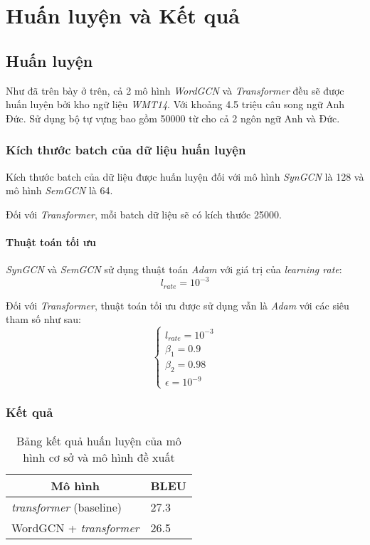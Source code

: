 \chapter{Huấn luyện và Kết quả}

\section{Huấn luyện}

Như đã trên bày ở trên, cả 2 mô hình \textit{WordGCN} và  \textit{Transformer}  đều sẽ được huấn luyện bởi kho ngữ liệu \textit{WMT14}. Với khoảng 4.5 triệu câu song ngữ Anh Đức. Sử dụng bộ tự vựng bao gồm 50000 từ cho cả 2 ngôn ngữ Anh và Đức.

\subsection{Kích thước batch của dữ liệu huấn luyện}
Kích thước batch của dữ liệu được huấn luyện đối với mô hình \textit{SynGCN} là 128 và mô hình \textit{SemGCN} là 64. 

Đối với \textit{Transformer}, mỗi batch dữ liệu sẽ có kích thước 25000.

\subsubsection{Thuật toán tối ưu}
\textit{SynGCN} và \textit{SemGCN} sử dụng thuật toán \textit{Adam} với giá trị của \textit{learning rate}:
\begin{equation*}
	l_{rate} = 10^{-3}
\end{equation*}

Đối với \textit{Transformer}, thuật toán tối ưu được sử dụng vẫn là \textit{Adam} với các siêu tham số như sau:
\begin{equation*}
	\begin{cases}
		l_{rate} = 10^{-3} \\
		\beta_1 = 0.9 \\
		\beta_2 = 0.98 \\
		\epsilon = 10^{-9}
	\end{cases}
\end{equation*}

\subsection{Kết quả}

\begin{table}[H]
\centering
\begin{tabular}{ll}
	\multicolumn{1}{c|}{Mô hình}                 & \multicolumn{1}{c}{BLEU}  \\ \hline
	\multicolumn{1}{l|}{ \textit{transformer} (baseline)}           & \multicolumn{1}{l}{27.3} \\ \hline
	\multicolumn{1}{l|}{WordGCN +  \textit{transformer} } & \multicolumn{1}{l}{26.5} \\ \hline
\end{tabular}
\caption{Bảng kết quả huấn luyện của mô hình cơ sở và mô hình đề xuất}
\end{table}

